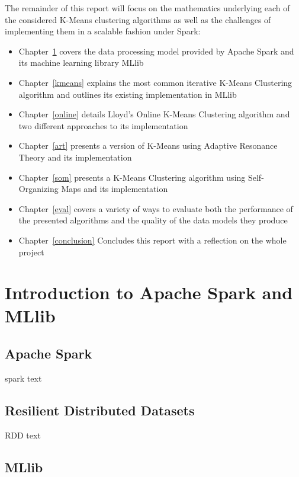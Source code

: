 \documentclass{l4proj}
\begin{document}
The remainder of this report will focus on the mathematics underlying each of the considered K-Means clustering algorithms as well as the challenges of implementing them in a scalable fashion under Spark:
\begin{itemize}
\item Chapter~\ref{spark} covers the data processing model provided by Apache Spark and its machine learning library MLlib
\item Chapter~\ref{kmeans} explains the most common iterative K-Means Clustering algorithm and outlines its existing implementation in MLlib
\item Chapter~\ref{online} details Lloyd's Online K-Means Clustering algorithm and two different approaches to its implementation
\item Chapter~\ref{art} presents a version of K-Means using Adaptive Resonance Theory and its implementation
\item Chapter~\ref{som} presents a K-Means Clustering algorithm using Self-Organizing Maps and its implementation
\item Chapter~\ref{eval} covers a variety of ways to evaluate both the performance of the presented algorithms and the quality of the data models they produce
\item Chapter~\ref{conclusion} Concludes this report with a reflection on the whole project
\end{itemize}


\chapter{Introduction to Apache Spark and MLlib}
\label{spark}
\section{Apache Spark}

spark text

\section{Resilient Distributed Datasets}

RDD text

\section{MLlib}
\end{document}
